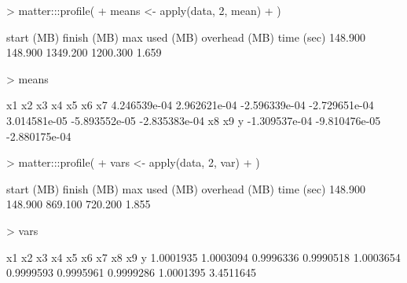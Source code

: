 \documentclass[a4paper]{article}
\begin{document}
\begin{Schunk}
\begin{Sinput}
> matter:::profile({
+   means <- apply(data, 2, mean)
+ })
\end{Sinput}
\begin{Soutput}
   start (MB)   finish (MB) max used (MB) overhead (MB)    time (sec) 
      148.900       148.900      1349.200      1200.300         1.659 
\end{Soutput}
\begin{Sinput}
> means
\end{Sinput}
\begin{Soutput}
           x1            x2            x3            x4            x5            x6            x7 
 4.246539e-04  2.962621e-04 -2.596339e-04 -2.729651e-04  3.014581e-05 -5.893552e-05 -2.835383e-04 
           x8            x9             y 
-1.309537e-04 -9.810476e-05 -2.880175e-04 
\end{Soutput}
\begin{Sinput}
> matter:::profile({
+   vars <- apply(data, 2, var)
+ })
\end{Sinput}
\begin{Soutput}
   start (MB)   finish (MB) max used (MB) overhead (MB)    time (sec) 
      148.900       148.900       869.100       720.200         1.855 
\end{Soutput}
\begin{Sinput}
> vars
\end{Sinput}
\begin{Soutput}
       x1        x2        x3        x4        x5        x6        x7        x8        x9         y 
1.0001935 1.0003094 0.9996336 0.9990518 1.0003654 0.9999593 0.9995961 0.9999286 1.0001395 3.4511645 
\end{Soutput}
\end{Schunk}
\end{document}
